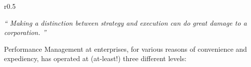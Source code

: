 %
%

\begin{wrapfigure}[3]{r}{0.5\textwidth}
    \vspace{-42pt}
    \begin{center}
        \begin{tcolorbox}[colback=secondary!5,colframe=secondary!60,left=2pt,right=2pt]
            \itshape\large\enquote{%
                Making a distinction between strategy and execution can do great damage to a corporation.%
            }%
            \begin{flushright}\textcite{the_execution_trap}\end{flushright}%
        \end{tcolorbox}
    \end{center}
\end{wrapfigure}

Performance Management at enterprises, for various reasons of convenience and expediency,
has operated at (at-least!) three different levels:

